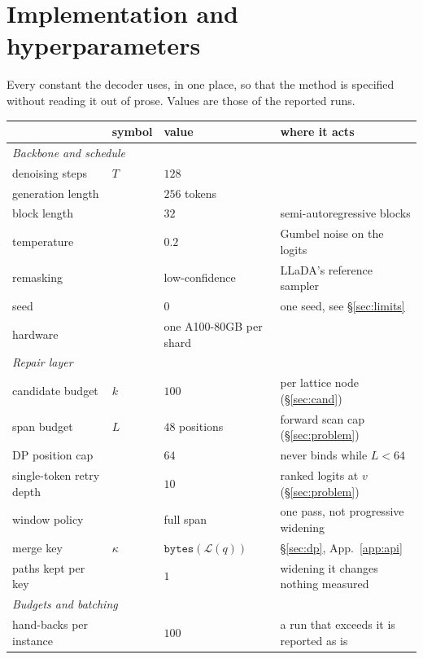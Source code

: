 \section{Implementation and hyperparameters}
\label{app:config}

Every constant the decoder uses, in one place, so that the method is specified
without reading it out of prose. Values are those of the reported runs.

\begin{center}
\small
\begin{tabular}{llll}
\toprule
 & symbol & value & where it acts \\
\midrule
\multicolumn{4}{l}{\emph{Backbone and schedule}}\\
denoising steps          & $T$ & $128$ & \\
generation length        &     & $256$ tokens & \\
block length             &     & $32$ & semi-autoregressive blocks \\
temperature              &     & $0.2$ & Gumbel noise on the logits \\
remasking                &     & low-confidence & LLaDA's reference sampler \\
seed                     &     & $0$ & one seed, see \S\ref{sec:limits} \\
hardware                 &     & one A100-80GB per shard & \\
\midrule
\multicolumn{4}{l}{\emph{Repair layer}}\\
candidate budget         & $k$ & $100$ & per lattice node (\S\ref{sec:cand}) \\
span budget              & $L$ & $48$ positions & forward scan cap (\S\ref{sec:problem}) \\
DP position cap          &     & $64$ & never binds while $L<64$ \\
single-token retry depth &     & $10$ & ranked logits at $v$ (\S\ref{sec:problem}) \\
window policy            &     & full span & one pass, not progressive widening \\
merge key                & $\kappa$ & $\texttt{bytes}(\mathcal{L}(q))$ & \S\ref{sec:dp}, App.~\ref{app:api} \\
paths kept per key       &     & $1$ & widening it changes nothing measured \\
\midrule
\multicolumn{4}{l}{\emph{Budgets and batching}}\\
hand-backs per instance  &     & $100$ & a run that exceeds it is reported as is \\

\end{tabular}
\end{center}
